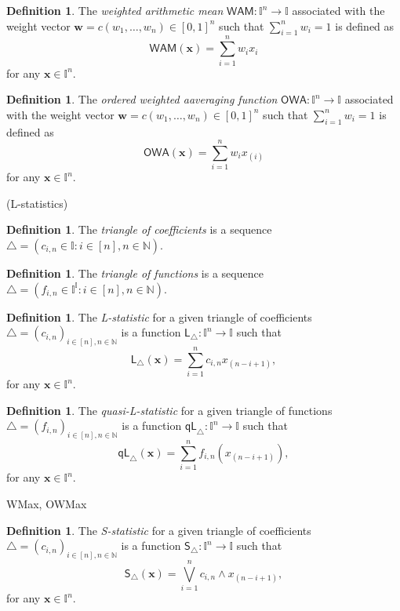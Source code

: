 \documentclass[11pt]{article}\usepackage{graphicx, color}
\renewcommand{\emph}[1]{\textsl{#1}}
\newcommand{\vect}[1]{{\mathbf{#1}}}
\newcommand{\func}[1]{{\mathsf{#1}}}
\newcommand{\Naturals}{\mathbb{N}}
\newcommand{\Ival}{\mathbb{I}}
\newcommand{\IvalPow}[1]{\mathbb{I}^{#1}}
\theoremstyle{remark}
\theoremstyle{definition}
\newtheorem{definition}[theorem]{Definition}
\begin{document}
% 
% 
% 


\begin{definition}
The \emph{weighted arithmetic mean} $\func{WAM}: \IvalPow{n}\to\Ival$ associated 
with the weight vector $\vect{w}=c(w_{1},\dots,w_{n})\in[0,1]^{n}$ such that 
$\sum_{i=1}^{n}w_{i}=1$ is defined as 
\[
\func{WAM}(\vect{x})=\sum_{i=1}^{n}w_{i}x_{i}
\] for any $\vect{x}\in\IvalPow{n}$.
\end{definition}

\begin{definition}
The \emph{ordered weighted aaveraging function} $\func{OWA}: \IvalPow{n}\to\Ival$ associated 
with the weight vector $\vect{w}=c(w_{1},\dots,w_{n})\in[0,1]^{n}$ such that 
$\sum_{i=1}^{n}w_{i}=1$ is defined as 
\[
\func{OWA}(\vect{x})=\sum_{i=1}^{n}w_{i}x_{(i)}
\] for any $\vect{x}\in\IvalPow{n}$.
\end{definition}

 (L-statistics)
\begin{definition}
The \emph{triangle of coefficients} is a sequence $\triangle=(c_{i,n}\in\Ival: i\in [n], n\in\Naturals)$.
\end{definition}

\begin{definition}
The \emph{triangle of functions} is a sequence $\triangle=(f_{i,n}\in\IvalPow{\Ival}: i\in [n], n\in\Naturals)$.
\end{definition}

\begin{definition}
The \emph{L-statistic} for a given triangle of coefficients $\triangle=(c_{i,n})_{ i\in [n],n\in\Naturals}$
is a function $\func{L}_{\triangle}:\IvalPow{n}\to\Ival$ such that 
\[
\func{L}_{\triangle}(\vect{x})=\sum_{i=1}^{n}c_{i,n}x_{(n-i+1)},
\] for any $\vect{x}\in\IvalPow{n}$.
\end{definition}

\begin{definition}
The \emph{quasi-L-statistic} for a given triangle of functions $\triangle=(f_{i,n})_{ i\in [n],n\in\Naturals}$
is a function $\func{qL}_{\triangle}:\IvalPow{n}\to\Ival$ such that 
\[
\func{qL}_{\triangle}(\vect{x})=\sum_{i=1}^{n}f_{i,n}(x_{(n-i+1)}),
\] for any $\vect{x}\in\IvalPow{n}$.
\end{definition}

WMax, OWMax 

\begin{definition}
The \emph{S-statistic} for a given triangle of coefficients $\triangle=(c_{i,n})_{ i\in [n],n\in\Naturals}$
is a function $\func{S}_{\triangle}:\IvalPow{n}\to\Ival$ such that 
\[
\func{S}_{\triangle}(\vect{x})=\bigvee_{i=1}^{n}c_{i,n}\wedge x_{(n-i+1)},
\] for any $\vect{x}\in\IvalPow{n}$.
\end{definition}
\end{document}
